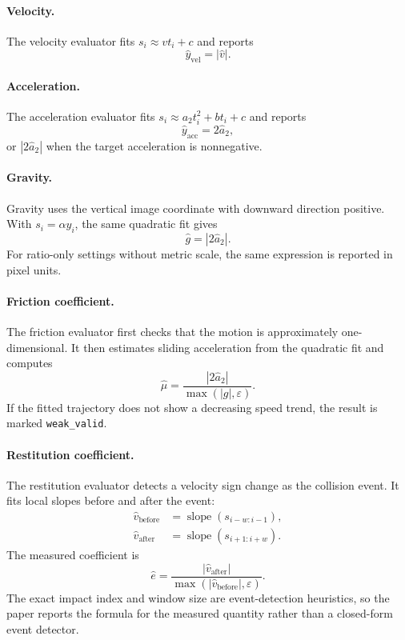\documentclass{article}
\newcommand{\eps}{\varepsilon}
\begin{document}
\paragraph{Velocity.}
The velocity evaluator fits $s_i\approx vt_i+c$ and reports
\begin{equation}
    \hat{y}_{\mathrm{vel}} = |\hat{v}|.
\end{equation}

\paragraph{Acceleration.}
The acceleration evaluator fits $s_i\approx a_2t_i^2+bt_i+c$ and reports
\begin{equation}
    \hat{y}_{\mathrm{acc}} = 2\hat{a}_2,
\end{equation}
or $|2\hat{a}_2|$ when the target acceleration is nonnegative.

\paragraph{Gravity.}
Gravity uses the vertical image coordinate with downward direction positive.
With $s_i=\alpha y_i$, the same quadratic fit gives
\begin{equation}
    \hat{g} = |2\hat{a}_2|.
\end{equation}
For ratio-only settings without metric scale, the same expression is reported in pixel units.

\paragraph{Friction coefficient.}
The friction evaluator first checks that the motion is approximately one-dimensional.
It then estimates sliding acceleration from the quadratic fit and computes
\begin{equation}
    \hat{\mu} = \frac{|2\hat{a}_2|}{\max(|g|,\eps)}.
\end{equation}
If the fitted trajectory does not show a decreasing speed trend, the result is marked \texttt{weak\_valid}.

\paragraph{Restitution coefficient.}
The restitution evaluator detects a velocity sign change as the collision event.
It fits local slopes before and after the event:
\begin{align}
    \hat{v}_{\mathrm{before}} &= \operatorname{slope}(s_{i-w:i-1}),\\
    \hat{v}_{\mathrm{after}} &= \operatorname{slope}(s_{i+1:i+w}).
\end{align}
The measured coefficient is
\begin{equation}
    \hat{e} = \frac{|\hat{v}_{\mathrm{after}}|}{\max(|\hat{v}_{\mathrm{before}}|,\eps)}.
\end{equation}
The exact impact index and window size are event-detection heuristics, so the paper reports the formula for the measured quantity rather than a closed-form event detector.
\end{document}
